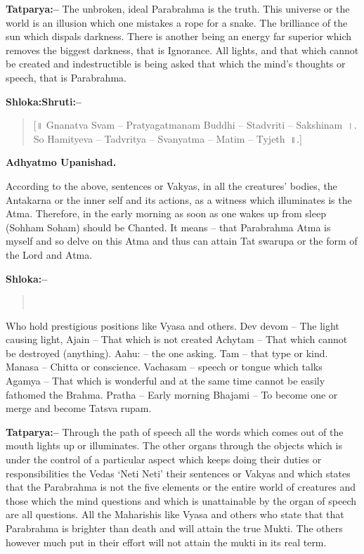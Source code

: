 \textbf{Tatparya:–} The unbroken, ideal Parabrahma is the truth. This universe or the world is an illusion which one mistakes a rope for a snake. The brilliance of the sun which dispals darkness. There is another being an energy far superior which removes the biggest darkness, that is Ignorance. All lights, and that which cannot be created and indestructible is being asked that which the mind's thoughts or speech, that is Parabrahma.

\textbf{Shloka:Shruti:–}

\begin{verse}
[॥ Gnanatva Svam – Pratyagatmanam Buddhi – Stadvriti – Sakshinam~।. So Hamityeva – Tadvritya – Svanyatma – Matim – Tyjeth~॥.]
\end{verse}

\begin{flushright}
\textbf{Adhyatmo Upanishad.}
\end{flushright}

According to the above, sentences or Vakyas, in all the creatures' bodies, the Antakarna or the inner self and its actions, as a witness which illuminates is the Atma. Therefore, in the early morning as soon as one wakes up from sleep (Sohham Soham) should be Chanted. It means – that Parabrahma Atma is myself and so delve on this Atma and thus can attain Tat swarupa or the form of the Lord and Atma.

\textbf{Shloka:–}

\begin{verse}
 \\
\end{verse}

Who hold prestigious positions like Vyasa and others. Dev devom – The light causing light, Ajain – That which is not created Achytam – That which cannot be destroyed (anything). Aahu: – the one asking. Tam – that type or kind. Manasa – Chitta or conscience. Vachasam – speech or tongue which talks Agamya – That which is wonderful and at the same time cannot be easily fathomed the Brahma. Pratha – Early morning Bhajami – To become one or merge and become Tatsva rupam.

\textbf{Tatparya:–} Through the path of speech all the words which comes out of the mouth lights up or illuminates. The other organs through the objects which is under the control of a particular aspect which keeps doing their duties or responsibilities the Vedas ‘Neti Neti’ their sentences or Vakyas and which states that the Parabrahma is not the five elements or the entire world of creatures and those which the mind questions and which is unattainable by the organ of speech are all questions. All the Maharishis like Vyasa and others who state that that Parabrahma is brighter than death and will attain the true Mukti. The others however much put in their effort will not attain the mukti in its real term.

